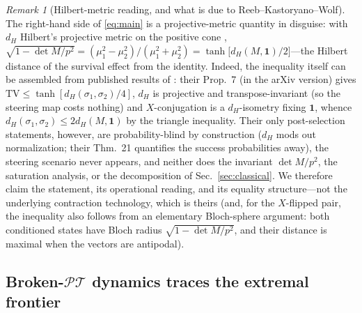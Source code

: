 \documentclass[11pt]{article}
\theoremstyle{remark}
\newtheorem{remark}[theorem]{Remark}
\newcommand{\PT}{\mathcal{PT}}
\newcommand{\TV}{\mathrm{TV}}
\begin{document}
\begin{remark}[Hilbert-metric reading, and what is due to
Reeb--Kastoryano--Wolf]
\label{rem:hilbert}
The right-hand side of \eqref{eq:main} is a projective-metric
quantity in disguise: with $d_H$ Hilbert's projective metric on the
positive cone \cite{RKW2011},
$\sqrt{1-\det M/p^{2}}=(\mu_1^{2}-\mu_2^{2})/(\mu_1^{2}+\mu_2^{2})
=\tanh\bigl[d_H(M,\mathbf 1)/2\bigr]$---the Hilbert distance of the
survival effect from the identity. Indeed, the inequality itself
can be assembled from published results of \cite{RKW2011}: their
Prop.~7 (in the arXiv version) gives $\TV\le\tanh[d_H(\sigma_1,\sigma_2)/4]$, $d_H$ is
projective and transpose-invariant (so the steering map costs nothing) and
$X$-conjugation is a $d_H$-isometry fixing $\mathbf 1$, whence
$d_H(\sigma_1,\sigma_2)\le2d_H(M,\mathbf 1)$ by the triangle
inequality. Their only post-selection statements, however, are
probability-blind by construction ($d_H$ mods out normalization;
their Thm.~21 quantifies the success probabilities away), the
steering scenario never appears, and neither does the invariant
$\det M/p^{2}$, the saturation analysis, or the decomposition of
Sec.~\ref{sec:classical}. We therefore claim the statement, its
operational reading, and its equality structure---not the
underlying contraction technology, which is theirs (and, for the
$X$-flipped pair, the inequality also follows from an elementary
Bloch-sphere argument: both conditioned states have Bloch radius
$\sqrt{1-\det M/p^{2}}$, and their distance is maximal when the
vectors are antipodal).
\end{remark}

\subsection{Broken-\texorpdfstring{$\PT$}{PT} dynamics traces the extremal frontier}
\end{document}
